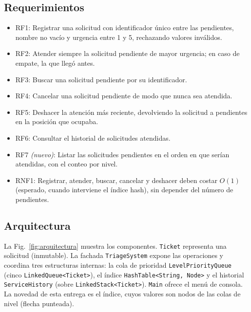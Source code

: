 \subsection{Requerimientos}

\begin{itemize}
  \item RF1: Registrar una solicitud con identificador único entre las
    pendientes, nombre no vacío y urgencia entre 1 y 5, rechazando valores
    inválidos.
  \item RF2: Atender siempre la solicitud pendiente de mayor urgencia; en
    caso de empate, la que llegó antes.
  \item RF3: Buscar una solicitud pendiente por su identificador.
  \item RF4: Cancelar una solicitud pendiente de modo que nunca sea
    atendida.
  \item RF5: Deshacer la atención más reciente, devolviendo la solicitud a
    pendientes en la posición que ocupaba.
  \item RF6: Consultar el historial de solicitudes atendidas.
  \item RF7 \emph{(nuevo)}: Listar las solicitudes pendientes en el orden
    en que serían atendidas, con el conteo por nivel.
  \item RNF1: Registrar, atender, buscar, cancelar y deshacer deben costar
    $O(1)$ (esperado, cuando interviene el índice hash), sin depender del
    número de pendientes.
\end{itemize}

\subsection{Arquitectura}

La Fig.~\ref{fig:arquitectura} muestra los componentes. \texttt{Ticket}
representa una solicitud (inmutable). La fachada \texttt{TriageSystem}
expone las operaciones y coordina tres estructuras internas: la cola de
prioridad \texttt{LevelPriorityQueue} (cinco \texttt{LinkedQueue<Ticket>}),
el índice \texttt{HashTable<String, Node>} y el historial
\texttt{ServiceHistory} (sobre \texttt{LinkedStack<Ticket>}). \texttt{Main}
ofrece el menú de consola. La novedad de esta entrega es el índice, cuyos
valores son nodos de las colas de nivel (flecha punteada).

